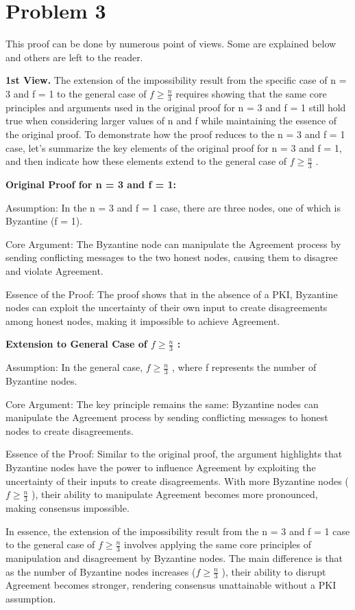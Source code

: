 \documentclass{article}
\begin{document}
\section*{Problem 3}

This proof can be done by numerous point of views. Some are explained below and others are left to the reader.

\textbf{1st View.} The extension of the impossibility result from the specific case of n = 3 and f = 1 to the general case of $ f\ge \frac{n}{3}$  requires showing that the same core principles and arguments used in the original proof for n = 3 and f = 1 still hold true when considering larger values of n and f while maintaining the essence of the original proof. To demonstrate how the proof reduces to the n = 3 and f = 1 case, let's summarize the key elements of the original proof for n = 3 and f = 1, and then indicate how these elements extend to the general case of $ f\ge \frac{n}{3}$ .

 \textbf{Original Proof for n = 3 and f = 1:}

 Assumption: In the n = 3 and f = 1 case, there are three nodes, one of which is Byzantine (f = 1).

Core Argument: The Byzantine node can manipulate the Agreement process by sending conflicting messages to the two honest nodes, causing them to disagree and violate Agreement.

Essence of the Proof: The proof shows that in the absence of a PKI, Byzantine nodes can exploit the uncertainty of their own input to create disagreements among honest nodes, making it impossible to achieve Agreement.

\textbf{Extension to General Case of $ f\ge \frac{n}{3}$ :}

Assumption: In the general case, $ f\ge \frac{n}{3}$ , where f represents the number of Byzantine nodes.

Core Argument: The key principle remains the same: Byzantine nodes can manipulate the Agreement process by sending conflicting messages to honest nodes to create disagreements.

Essence of the Proof: Similar to the original proof, the argument highlights that Byzantine nodes have the power to influence Agreement by exploiting the uncertainty of their inputs to create disagreements. With more Byzantine nodes ($ f\ge \frac{n}{3}$ ), their ability to manipulate Agreement becomes more pronounced, making consensus impossible.

In essence, the extension of the impossibility result from the n = 3 and f = 1 case to the general case of $ f\ge \frac{n}{3}$  involves applying the same core principles of manipulation and disagreement by Byzantine nodes. The main difference is that as the number of Byzantine nodes increases ($ f\ge \frac{n}{3}$ ), their ability to disrupt Agreement becomes stronger, rendering consensus unattainable without a PKI assumption.
\\ 
\end{document}
